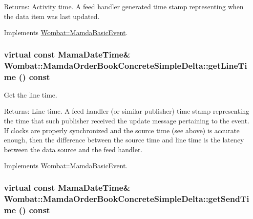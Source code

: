 \begin{Desc}
\item[Returns:]Activity time. A feed handler generated time stamp representing when the data item was last updated. \end{Desc}


Implements \hyperlink{classWombat_1_1MamdaBasicEvent_b3810afc69474ef3b192ee4c9307e714}{Wombat::Mamda\-Basic\-Event}.\hypertarget{classWombat_1_1MamdaOrderBookConcreteSimpleDelta_21b2f8800eceb76e80b9f1b445666681}{
\subsubsection[getLineTime]{\setlength{\rightskip}{0pt plus 5cm}virtual const Mama\-Date\-Time\& Wombat::Mamda\-Order\-Book\-Concrete\-Simple\-Delta::get\-Line\-Time () const}}
\label{classWombat_1_1MamdaOrderBookConcreteSimpleDelta_21b2f8800eceb76e80b9f1b445666681}


Get the line time. 

\begin{Desc}
\item[Returns:]Line time. A feed handler (or similar publisher) time stamp representing the time that such publisher received the update message pertaining to the event. If clocks are properly synchronized and the source time (see above) is accurate enough, then the difference between the source time and line time is the latency between the data source and the feed handler. \end{Desc}


Implements \hyperlink{classWombat_1_1MamdaBasicEvent_3fcc26fa1a6446bcec12b11ac74ed26d}{Wombat::Mamda\-Basic\-Event}.\hypertarget{classWombat_1_1MamdaOrderBookConcreteSimpleDelta_8df1e676c05ca64e009164354f2b68fb}{
\subsubsection[getSendTime]{\setlength{\rightskip}{0pt plus 5cm}virtual const Mama\-Date\-Time\& Wombat::Mamda\-Order\-Book\-Concrete\-Simple\-Delta::get\-Send\-Time () const}}
\label{classWombat_1_1MamdaOrderBookConcreteSimpleDelta_8df1e676c05ca64e009164354f2b68fb}


